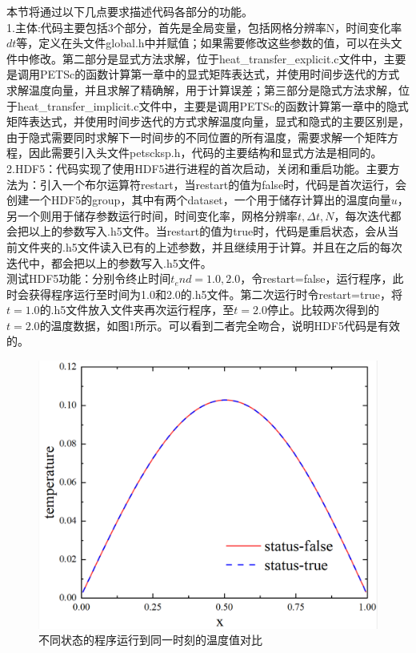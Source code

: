 \documentclass{article}
\begin{document}
		本节将通过以下几点要求描述代码各部分的功能。\\
		1.主体:代码主要包括3个部分，首先是全局变量，包括网格分辨率N，时间变化率$dt$等，定义在头文件global.h中并赋值；如果需要修改这些参数的值，可以在头文件中修改。第二部分是显式方法求解，位于heat\_transfer\_explicit.c文件中，主要是调用PETSc的函数计算第一章中的显式矩阵表达式，并使用时间步迭代的方式求解温度向量，并且求解了精确解，用于计算误差；第三部分是隐式方法求解，位于heat\_transfer\_implicit.c文件中，主要是调用PETSc的函数计算第一章中的隐式矩阵表达式，并使用时间步迭代的方式求解温度向量，显式和隐式的主要区别是，由于隐式需要同时求解下一时间步的不同位置的所有温度，需要求解一个矩阵方程，因此需要引入头文件petscksp.h，代码的主要结构和显式方法是相同的。
		\\
		2.HDF5：代码实现了使用HDF5进行进程的首次启动，关闭和重启功能。主要方法为：引入一个布尔运算符restart，当restart的值为false时，代码是首次运行，会创建一个HDF5的group，其中有两个dataset，一个用于储存计算出的温度向量$u$，另一个则用于储存参数运行时间，时间变化率，网格分辨率$t,\Delta t,N$，每次迭代都会把以上的参数写入.h5文件。当restart的值为true时，代码是重启状态，会从当前文件夹的.h5文件读入已有的上述参数，并且继续用于计算。并且在之后的每次迭代中，都会把以上的参数写入.h5文件。
		\\测试HDF5功能：分别令终止时间$t_end=1.0,2.0$，令restart=false，运行程序，此时会获得程序运行至时间为1.0和2.0的.h5文件。第二次运行时令restart=true，将$t=1.0$的.h5文件放入文件夹再次运行程序，至$t=2.0$停止。比较两次得到的$t=2.0$的温度数据，如图1所示。可以看到二者完全吻合，说明HDF5代码是有效的。
		\begin{figure}
			\centering
			\includegraphics[width=0.7\linewidth]{screenshot001}
			\caption[]{不同状态的程序运行到同一时刻的温度值对比}
			\label{fig:screenshot001}
		\end{figure}
		\\
\end{document}

